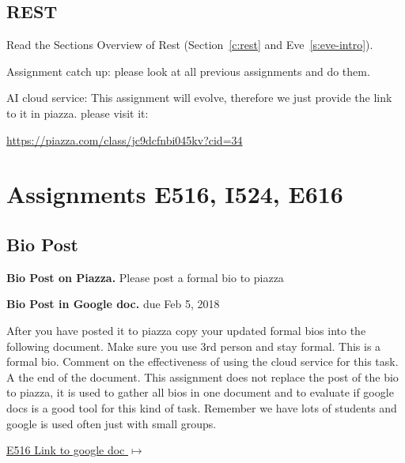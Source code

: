 \subsection{REST}
\begin{exercise}
Read the Sections Overview of Rest (Section~\ref{c:rest} and Eve~\ref{s:eve-intro}).
\end{exercise}

\begin{exercise}
Assignment catch up: please look at all previous assignments and do
them. 
\end{exercise}

\begin{exercise}

AI cloud service: This assignment will evolve, therefore we just
provide the link to it in piazza. please visit it:

\url{https://piazza.com/class/jc9dcfnbi045kv?cid=34}
\end{exercise}

\section{Assignments E516, I524, E616}
\label{s:616-assignments}

\subsection{Bio Post}\label{a:616-bio}

\begin{exercise}\label{E:616-bio-piazza}
{\bf Bio Post on Piazza.} Please post a formal bio to piazza
\end{exercise}

\begin{exercise} \label{E:616-bio-googledocs}

  {\bf Bio Post in Google doc.} due Feb 5, 2018
  
  After you have posted it to piazza
  copy your updated formal bios into the following document.  Make
  sure you use 3rd person and stay formal. This is a formal
  bio. Comment on the effectiveness of using the cloud service for
  this task. A the end of the document. This assignment does not
  replace the post of the bio to piazza, it is used to gather all bios
  in one document and to evaluate if google docs is a good tool for
  this kind of task. Remember we have lots of students and google is
  used often just with small groups.
 
 \smallskip

 {\hfill
   \href{https://docs.google.com/document/d/1ejzlKYqC3dLac8WXVpcPQsJh1j4BDqRxxgGg1cFQbeQ/edit?usp=sharing}{E516
     Link to google doc $\mapsto$}}


 \end{exercise}

